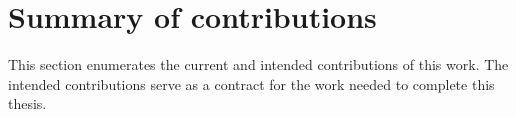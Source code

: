 \begin{itemize}
      \end{itemize}
        
    
    \section{Summary of contributions}\label{sec:contributions}
        This section enumerates the current and intended contributions of this
          work.
        The intended contributions serve as a contract for the work needed to
          complete this thesis.
      
